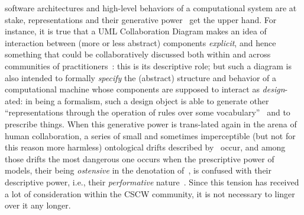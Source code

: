 \documentclass{article}
\begin{document}
software architectures and high-level behaviors of a computational system are at stake, representations and their generative power~\citep{bowers_politics_1992} get the upper hand. For instance, it is true that a UML Collaboration Diagram makes an idea of interaction between (more or less abstract) components \emph{explicit}, and hence something that could be collaboratively discussed both within and across communities of practitioners~\citep[e.g., ][]{mcleod_documents_2010}: this is its descriptive role; but such a diagram is also intended to formally \emph{specify} the (abstract) structure and behavior of a computational machine whose components are supposed to interact as \emph{design}-ated: in being a formalism, such a design object is able to generate other ``representations through the operation of rules over some vocabulary''~\citep{bowers_politics_1992} and to prescribe things. When this generative power is trans-lated again in the arena of human collaboration, a series of small and sometimes imperceptible (but not for this reason more harmless) ontological drifts described by~\citet{robinson_questioning_1991} occur, and among those drifts the most dangerous one occurs when the prescriptive power of models, their being \emph{ostensive} in the denotation of~\citet{poltrock_modeling_2009}, is confused with their descriptive power, i.e., their \emph{performative} nature~\citep{poltrock_modeling_2009}. Since this tension has received a lot of consideration within the CSCW community, it is not necessary to linger over it any longer. 
\end{document}
